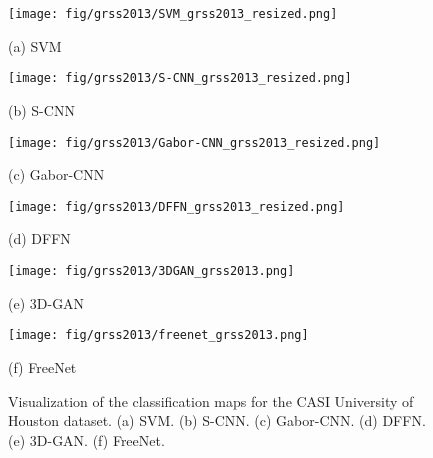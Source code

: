 \documentclass[journal]{IEEEtran}
\begin{document}
\begin{figure}[htb]
  \begin{minipage}[b]{\linewidth}
    \centering
    \texttt{[image: fig/grss2013/SVM\_grss2013\_resized.png]}
    \centerline{(a) SVM}
  \end{minipage}
  \vfill
  \vspace{4pt}
  \begin{minipage}[b]{\linewidth}
    \centering
    \texttt{[image: fig/grss2013/S-CNN\_grss2013\_resized.png]}
    \centerline{(b) S-CNN}
  \end{minipage}
  \vfill
  \vspace{4pt}
  \begin{minipage}[b]{\linewidth}
    \centering
    \texttt{[image: fig/grss2013/Gabor-CNN\_grss2013\_resized.png]}
    \centerline{(c) Gabor-CNN}
  \end{minipage}
  \vfill
  \vspace{4pt}
  \begin{minipage}[b]{\linewidth}
    \centering
    \texttt{[image: fig/grss2013/DFFN\_grss2013\_resized.png]}
    \centerline{(d) DFFN}
  \end{minipage}
  \vfill
  \vspace{4pt}
  \begin{minipage}[b]{\linewidth}
    \centering
    \texttt{[image: fig/grss2013/3DGAN\_grss2013.png]}
    \centerline{(e) 3D-GAN}
  \end{minipage}
  \vfill
  \vspace{4pt}
  \begin{minipage}[b]{\linewidth}
    \centering
    \texttt{[image: fig/grss2013/freenet\_grss2013.png]}
    \centerline{(f) FreeNet}
  \end{minipage}
  \caption{Visualization of the classification maps for the CASI University of Houston dataset.
    (a) SVM. (b) S-CNN. (c) Gabor-CNN. (d) DFFN. (e) 3D-GAN. (f) FreeNet.}
  \label{fig:vis_grss2013}
\end{figure}
\end{document}
